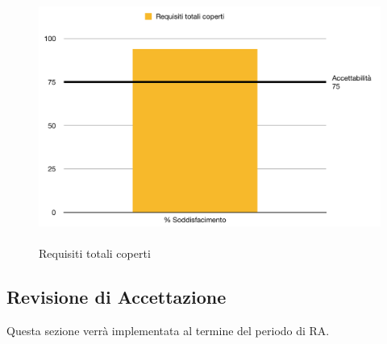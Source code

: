 \begin{minipage}[t]{0.25\textwidth}
	\begin{figure}[H]
		\includegraphics[scale=0.3]{./images/grafici_RQ/reqTotCop.png} 
		\caption{\-\\Requisiti totali coperti}
	\end{figure}
\end{minipage}


\subsection{Revisione di Accettazione}
Questa sezione verrà implementata al termine del periodo di RA.

